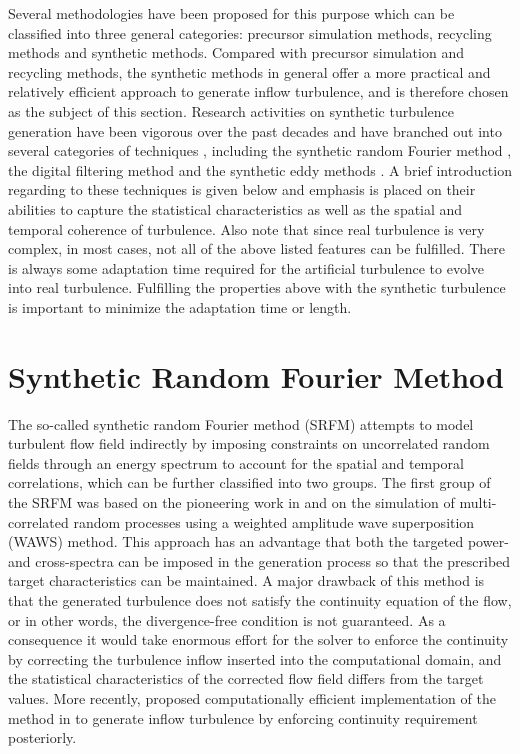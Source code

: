 \noindent Several methodologies have been proposed for this purpose which can be classified into three general categories: precursor simulation methods, recycling methods and synthetic methods. Compared with precursor simulation and recycling methods, the synthetic methods in general offer a more practical and relatively efficient approach to generate inflow turbulence, and is therefore chosen as the subject of this section. Research activities on synthetic turbulence generation have been vigorous over the past decades and have branched out into several categories of techniques \citep{wu2017}, including the synthetic random Fourier method \citep{kraichnan1970, hoshiya1972}, the digital filtering method \citep{klein2003, xie2008, kim2013} and the synthetic eddy methods \citep{jarrin2006, poletto2013, kroger2018}. A brief introduction regarding to these techniques is given below and emphasis is placed on their abilities to capture the statistical characteristics as well as the spatial and temporal coherence of turbulence. Also note that since real turbulence is very complex, in most cases, not all of the above listed features can be fulfilled. There is always some adaptation time required for the artificial turbulence to evolve into real turbulence. Fulfilling the properties above with the synthetic turbulence is important to minimize the adaptation time or length.

\section{Synthetic Random Fourier Method}

The so-called synthetic random Fourier method (SRFM) attempts to model turbulent flow field indirectly by imposing constraints on uncorrelated random fields through an energy spectrum to account for the spatial and temporal correlations, which can be further classified into two groups. 
The first group of the SRFM was based on the pioneering work in \cite{hoshiya1972} and \cite{shinozuka1972} on the simulation of multi-correlated random processes using a weighted amplitude wave superposition (WAWS) method. This approach has an advantage that both the targeted power- and cross-spectra can be imposed in the generation process so that the prescribed target characteristics can be maintained. A major drawback of this method is that the generated turbulence does not satisfy the continuity equation of the flow, or in other words, the divergence-free condition is not guaranteed. As a consequence it would take enormous effort for the solver to enforce the continuity by correcting the turbulence inflow inserted into the computational domain, and the statistical characteristics of the corrected flow field differs from the target values. More recently, \cite{melaku2021divergence} proposed computationally efficient implementation of the method in \cite{shinozuka1972} to generate inflow turbulence by enforcing continuity requirement posteriorly.  

